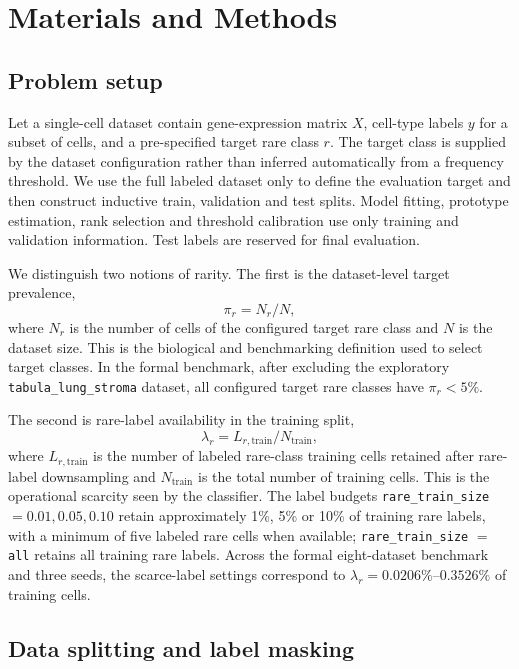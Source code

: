 \documentclass[11pt]{article}
\newcommand{\rare}{r}
\newcommand{\rts}{\texttt{rare\_train\_size}}
\begin{document}
\section{Materials and Methods}

\subsection{Problem setup}

Let a single-cell dataset contain gene-expression matrix $X$, cell-type labels
$y$ for a subset of cells, and a pre-specified target rare class $\rare$. The
target class is supplied by the dataset configuration rather than inferred
automatically from a frequency threshold. We use the full labeled dataset only
to define the evaluation target and then construct inductive train, validation
and test splits. Model fitting, prototype estimation, rank selection and
threshold calibration use only training and validation information. Test labels
are reserved for final evaluation.

We distinguish two notions of rarity. The first is the dataset-level target
prevalence,
\[
  \pi_\rare = N_\rare / N,
\]
where $N_\rare$ is the number of cells of the configured target rare class and
$N$ is the dataset size. This is the biological and benchmarking definition
used to select target classes. In the formal benchmark, after excluding the
exploratory \texttt{tabula\_lung\_stroma} dataset, all configured target rare
classes have $\pi_\rare < 5\%$.

The second is rare-label availability in the training split,
\[
  \lambda_\rare = L_{\rare,\mathrm{train}} / N_{\mathrm{train}},
\]
where $L_{\rare,\mathrm{train}}$ is the number of labeled rare-class training
cells retained after rare-label downsampling and $N_{\mathrm{train}}$ is the
total number of training cells. This is the operational scarcity seen by the
classifier. The label budgets \rts{} $=0.01, 0.05, 0.10$ retain approximately
1\%, 5\% or 10\% of training rare labels, with a minimum of five labeled rare
cells when available; \rts{} $=$ \texttt{all} retains all training rare labels.
Across the formal eight-dataset benchmark and three seeds, the scarce-label
settings correspond to $\lambda_\rare = 0.0206\%$--$0.3526\%$ of training
cells.

\subsection{Data splitting and label masking}
\end{document}
